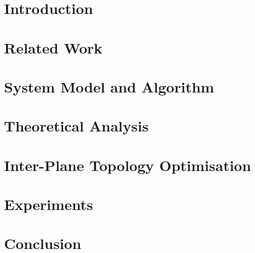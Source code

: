 \documentclass[conference]{IEEEtran}
\begin{document}

\section{Introduction}\label{sec:intro}


\section{Related Work}\label{sec:related}


\section{System Model and Algorithm}\label{sec:sysmodel}


\section{Theoretical Analysis}\label{sec:theory}


\section{Inter-Plane Topology Optimisation}\label{sec:sysopt}


\section{Experiments}\label{sec:experiments}









\section{Conclusion}\label{sec:conclusion}

\end{document}
